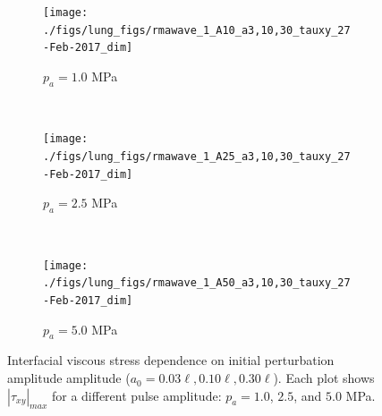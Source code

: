 \begin{figure}
  \centering
  \begin{subfigure}[b]{0.49\textwidth}
    \texttt{[image: ./figs/lung\_figs/rmawave\_1\_A10\_a3,10,30\_tauxy\_27-Feb-2017\_dim]}
    \caption{\label{fig:stress_multi-a0-A10} $p_a = 1.0$ MPa}
  \end{subfigure}
  ~
  \begin{subfigure}[b]{0.49\textwidth}
    \texttt{[image: ./figs/lung\_figs/rmawave\_1\_A25\_a3,10,30\_tauxy\_27-Feb-2017\_dim]}
    \caption{\label{fig:stress_multi-a0-A25} $p_a = 2.5$ MPa}
  \end{subfigure}
  ~ 
  \begin{subfigure}[b]{0.49\textwidth}
    \texttt{[image: ./figs/lung\_figs/rmawave\_1\_A50\_a3,10,30\_tauxy\_27-Feb-2017\_dim]}
    \caption{\label{fig:stress_multi-a0-A50} $p_a = 5.0$ MPa}
  \end{subfigure}
  \caption[Interfacial viscous stress dependence on initial
  perturbation amplitude amplitude
  ($a_0=0.03\ell, 0.10\ell, 0.30\ell$)]{Interfacial viscous stress
    dependence on initial perturbation amplitude amplitude
    ($a_0=0.03\ell, 0.10\ell, 0.30\ell$). Each plot shows
    $\left|\tau_{xy}\right|_{max}$ for a different pulse amplitude:
    $p_a = 1.0$,
    $2.5$, and
    $5.0$ MPa.}
  \label{fig:a0_dependence_stress}
\end{figure}
% 
% 
% 
% 
% 
% 
